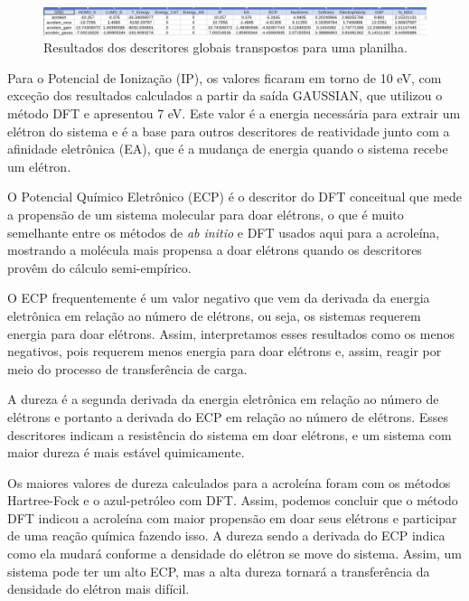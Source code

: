 \documentclass[a4paper,11pt]{refart}
\begin{document}
\hspace*{-1.2\leftmarginwidth}
\begin{minipage}{\fullwidth}
	\begin{figure}[H]
		\begin{center}
			\includegraphics[width=7in]{images/img4}
			\caption{Resultados dos descritores globais transpostos para uma planilha.}
			\label{fig_tut1_3}
		\end{center}
	\end{figure}
\end{minipage}	

Para o Potencial de Ionização (IP), os valores ficaram em torno de 10 eV, com exceção dos resultados calculados a partir da saída GAUSSIAN, que utilizou o método DFT e apresentou 7 eV. Este valor é a energia necessária para extrair um elétron do sistema e é a base para outros descritores de reatividade junto com a afinidade eletrônica (EA), que é a mudança de energia quando o sistema recebe um elétron. 

O Potencial Químico Eletrônico (ECP) é o descritor do DFT conceitual que mede a propensão de um sistema molecular para doar elétrons, o que é muito semelhante entre os métodos de \textit{ab initio} e DFT usados aqui para a acroleína, mostrando a molécula mais propensa a doar elétrons quando os descritores provêm do cálculo semi-empírico.

O ECP frequentemente é um valor negativo que vem da derivada da energia eletrônica em relação ao número de elétrons, ou seja, os sistemas requerem energia para doar elétrons. Assim, interpretamos esses resultados como os menos negativos, pois requerem menos energia para doar elétrons e, assim, reagir por meio do processo de transferência de carga.

A dureza é a segunda derivada da energia eletrônica em relação ao número de elétrons e portanto a derivada do ECP em relação ao número de elétrons. Esses descritores indicam a resistência do sistema em doar elétrons, e um sistema com maior dureza é mais estável quimicamente. 

Os maiores valores de dureza calculados para a acroleína foram com os métodos Hartree-Fock e o azul-petróleo com DFT. Assim, podemos concluir que o método DFT indicou a acroleína com maior propensão em doar seus elétrons e participar de uma reação química fazendo isso. A dureza sendo a derivada do ECP indica como ela mudará conforme a densidade do elétron se move do sistema. Assim, um sistema pode ter um alto ECP, mas a alta dureza tornará a transferência da densidade do elétron mais difícil.
\end{document}

